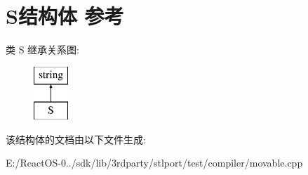 \hypertarget{struct_s}{}\section{S结构体 参考}
\label{struct_s}
类 S 继承关系图\+:\begin{figure}[H]
\begin{center}
\leavevmode
\includegraphics[height=2.000000cm]{struct_s}
\end{center}
\end{figure}


该结构体的文档由以下文件生成\+:\begin{DoxyCompactItemize}
\item 
E\+:/\+React\+O\+S-\/0../sdk/lib/3rdparty/stlport/test/compiler/movable.\+cpp\end{DoxyCompactItemize}
